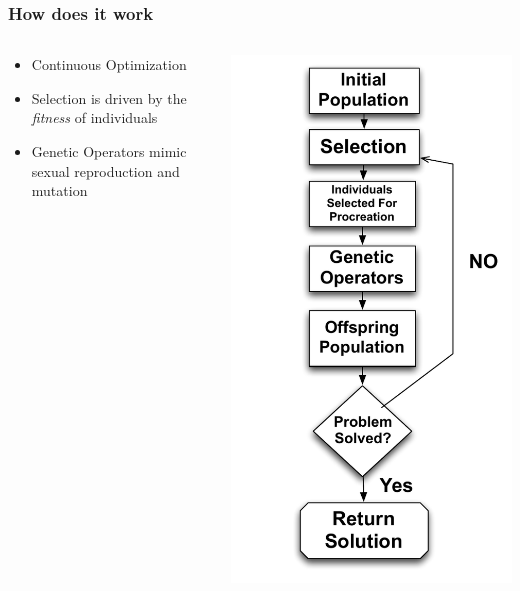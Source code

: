 \documentclass{beamer}
\begin{document}
\begin{frame}
	\frametitle{How does it work}
\begin{columns}
\begin{column}{0.6\textwidth}
\begin{itemize}	
	\item Continuous Optimization
	\item Selection is driven by the \textit{fitness} of individuals
	\item Genetic Operators mimic sexual reproduction and mutation
	
\end{itemize}
\end{column}
\begin{column}{0.4\textwidth}
   \includegraphics[height=0.90\textheight]{Illustrations/ECdiagram.pdf}
       \\
\end{column}
\end{columns}

\end{frame}
\end{document}
